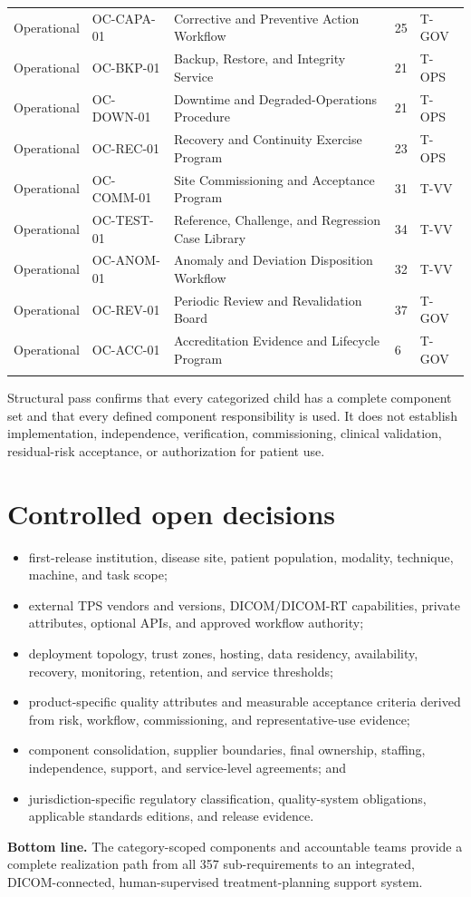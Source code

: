 \documentclass[11pt,letterpaper]{article}
\begin{document}
\begin{scriptsize}
\begin{longtable}{@{}L{0.12\textwidth}L{0.14\textwidth}L{0.44\textwidth}L{0.14\textwidth}L{0.08\textwidth}@{}}
\addlinespace[2pt]
Operational & OC-CAPA-01 & Corrective and Preventive Action Workflow & 25 & T-GOV \\
\addlinespace[2pt]
Operational & OC-BKP-01 & Backup, Restore, and Integrity Service & 21 & T-OPS \\
\addlinespace[2pt]
Operational & OC-DOWN-01 & Downtime and Degraded-Operations Procedure & 21 & T-OPS \\
\addlinespace[2pt]
Operational & OC-REC-01 & Recovery and Continuity Exercise Program & 23 & T-OPS \\
\addlinespace[2pt]
Operational & OC-COMM-01 & Site Commissioning and Acceptance Program & 31 & T-VV \\
\addlinespace[2pt]
Operational & OC-TEST-01 & Reference, Challenge, and Regression Case Library & 34 & T-VV \\
\addlinespace[2pt]
Operational & OC-ANOM-01 & Anomaly and Deviation Disposition Workflow & 32 & T-VV \\
\addlinespace[2pt]
Operational & OC-REV-01 & Periodic Review and Revalidation Board & 37 & T-GOV \\
\addlinespace[2pt]
Operational & OC-ACC-01 & Accreditation Evidence and Lifecycle Program & 6 & T-GOV \\
\addlinespace[2pt]
\end{longtable}
\end{scriptsize}

Structural pass confirms that every categorized child has a complete component set and that every defined component responsibility is used. It does not establish implementation, independence, verification, commissioning, clinical validation, residual-risk acceptance, or authorization for patient use.

\section{Controlled open decisions}

\begin{itemize}
\item first-release institution, disease site, patient population, modality, technique, machine, and task scope;
\item external TPS vendors and versions, DICOM/DICOM-RT capabilities, private attributes, optional APIs, and approved workflow authority;
\item deployment topology, trust zones, hosting, data residency, availability, recovery, monitoring, retention, and service thresholds;
\item product-specific quality attributes and measurable acceptance criteria derived from risk, workflow, commissioning, and representative-use evidence;
\item component consolidation, supplier boundaries, final ownership, staffing, independence, support, and service-level agreements; and
\item jurisdiction-specific regulatory classification, quality-system obligations, applicable standards editions, and release evidence.
\end{itemize}

\textbf{Bottom line. }The category-scoped components and accountable teams provide a complete realization path from all 357 sub-requirements to an integrated, DICOM-connected, human-supervised treatment-planning support system.
\end{document}
